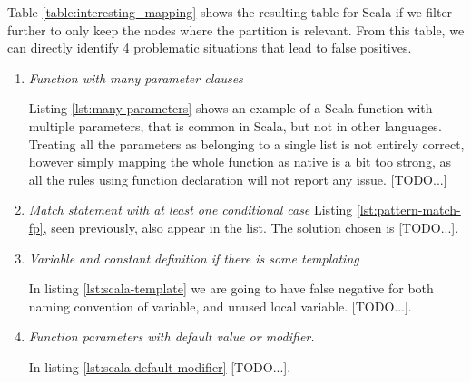 Table \ref{table:interesting_mapping} shows the resulting table for Scala if we filter further to only keep the nodes where the partition is relevant. From this table, we can directly identify 4 problematic situations that lead to false positives.

\begin{enumerate}
	\item \textit{Function with many parameter clauses} \newline 
	
	
	Listing \ref{lst:many-parameters} shows an example of a Scala function with multiple parameters, that is common in Scala, but not in other languages. 
	Treating all the parameters as belonging to a single list is not entirely correct, however simply mapping the whole function as native is a bit too strong, as all the rules using function declaration will not report any issue.
	[TODO...]
	
	\item \textit{Match statement with at least one conditional case} \newline 
	Listing \ref{lst:pattern-match-fp}, seen previously, also appear in the list. The solution chosen is 
	[TODO...].
	
	\item \textit{Variable and constant definition if there is some templating} \newline 
	
	
	In listing \ref{lst:scala-template} we are going to have false negative for both naming convention of variable, and unused local variable. 
	[TODO...].
	
	\item \textit{Function parameters with default value or modifier.} \newline 
	
	
	In listing \ref{lst:scala-default-modifier}
	[TODO...].
\end{enumerate}

